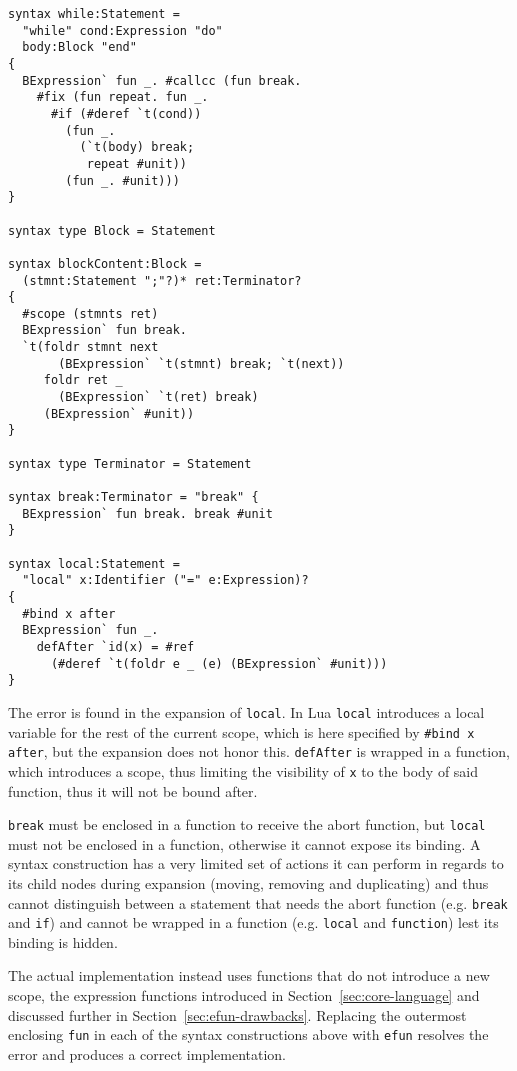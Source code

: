 \documentclass{kththesis}
\begin{document}
\begin{verbatim}
syntax while:Statement =
  "while" cond:Expression "do"
  body:Block "end"
{
  BExpression` fun _. #callcc (fun break.
    #fix (fun repeat. fun _.
      #if (#deref `t(cond))
        (fun _.
          (`t(body) break;
           repeat #unit))
        (fun _. #unit)))
}

syntax type Block = Statement

syntax blockContent:Block =
  (stmnt:Statement ";"?)* ret:Terminator?
{
  #scope (stmnts ret)
  BExpression` fun break.
  `t(foldr stmnt next
       (BExpression` `t(stmnt) break; `t(next))
     foldr ret _
       (BExpression` `t(ret) break)
     (BExpression` #unit))
}

syntax type Terminator = Statement

syntax break:Terminator = "break" {
  BExpression` fun break. break #unit
}

syntax local:Statement =
  "local" x:Identifier ("=" e:Expression)?
{
  #bind x after
  BExpression` fun _.
    defAfter `id(x) = #ref
      (#deref `t(foldr e _ (e) (BExpression` #unit)))
}
\end{verbatim}

The error is found in the expansion of \texttt{local}. In Lua \texttt{local} introduces a local variable for the rest of the current scope, which is here specified by \texttt{#bind x after}, but the expansion does not honor this. \texttt{defAfter} is wrapped in a function, which introduces a scope, thus limiting the visibility of \texttt{x} to the body of said function, thus it will not be bound after.

\texttt{break} must be enclosed in a function to receive the abort function, but \texttt{local} must not be enclosed in a function, otherwise it cannot expose its binding. A syntax construction has a very limited set of actions it can perform in regards to its child nodes during expansion (moving, removing and duplicating) and thus cannot distinguish between a statement that needs the abort function (e.g. \texttt{break} and \texttt{if}) and cannot be wrapped in a function (e.g. \texttt{local} and \texttt{function}) lest its binding is hidden.

The actual implementation instead uses functions that do not introduce a new scope, the expression functions introduced in Section~\ref{sec:core-language} and discussed further in Section~\ref{sec:efun-drawbacks}. Replacing the outermost enclosing \texttt{fun} in each of the syntax constructions above with \texttt{efun} resolves the error and produces a correct implementation.
\end{document}
